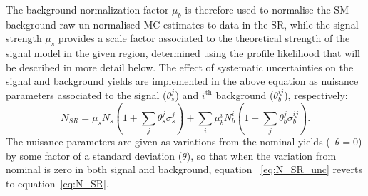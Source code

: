 	 The background normalization factor $\mu_b$ is therefore used to normalise the \ac{SM} background raw un-normalised \ac{MC} estimates to data in the \ac{SR}, while the signal strength $\mu_s$ provides a scale factor associated to the theoretical strength of the signal model in the given region, determined using the profile likelihood that will be described in more detail below.
	The effect of systematic uncertainties on the signal and background yields are implemented  in the above equation as nuisance parameters associated to the signal ($\theta_s^j$) and $i^{\textrm{th}}$ background ($\theta_b^{ij}$), respectively:
	\begin{equation}
	N_{SR}=\mu_sN_s(1+\sum_{j}\theta_s^j\sigma_s^j)+\sum_{i}\mu_b^iN_b^i(1+\sum_{j}\theta_b^j\sigma_b^{ij}).
	\label{eq:N_SR_unc}
	\end{equation}
	The nuisance parameters are given as variations from the nominal yields (\ie\ $\theta=0$) by some factor of a standard deviation ($\theta$), so that when the variation from nominal is zero in both signal and background, equation ~\ref{eq:N_SR_unc} reverts to equation~\ref{eq:N_SR}.
	
